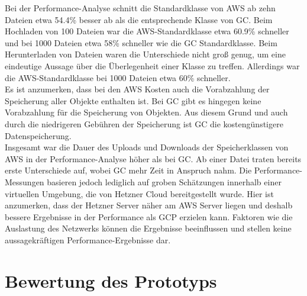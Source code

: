 Bei der Performance-Analyse schnitt die Standardklasse von AWS ab zehn Dateien etwa 54.4\% besser ab als die entsprechende Klasse von GC. Beim Hochladen von 100 Dateien war die AWS-Standardklasse etwa 60.9\% schneller und bei 1000 Dateien etwa 58\% schneller wie die GC Standardklasse. Beim Herunterladen von Dateien waren die Unterschiede nicht groß genug, um eine eindeutige Aussage über die Überlegenheit einer Klasse zu treffen. Allerdings war die AWS-Standardklasse bei 1000 Dateien etwa 60\% schneller.\\

Es ist anzumerken, dass bei den AWS Kosten auch die Vorabzahlung der Speicherung aller Objekte enthalten ist. Bei GC gibt es hingegen keine Vorabzahlung für die Speicherung von Objekten. Aus diesem Grund und auch durch die niedrigeren Gebühren der Speicherung ist GC die kostengünstigere Datenspeicherung.\\

Insgesamt war die Dauer des Uploads und Downloads der Speicherklassen von AWS in der Performance-Analyse höher als bei GC. Ab einer Datei traten bereits erste Unterschiede auf, wobei GC mehr Zeit in Anspruch nahm. Die Performance-Messungen basieren jedoch lediglich auf groben Schätzungen innerhalb einer virtuellen Umgebung, die von Hetzner Cloud bereitgestellt wurde. Hier ist anzumerken, dass der Hetzner Server näher am AWS Server liegen und deshalb bessere Ergebnisse in der Performance als GCP erzielen kann. Faktoren wie die Auslastung des Netzwerks können die Ergebnisse beeinflussen und stellen keine aussagekräftigen Performance-Ergebnisse dar.\\

\section{Bewertung des Prototyps}

